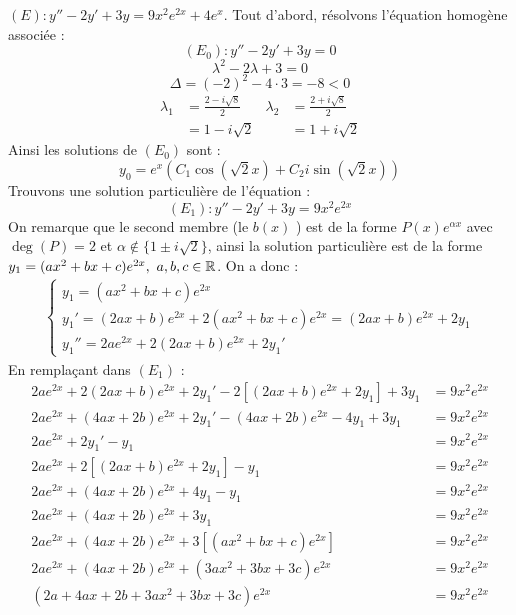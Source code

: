 \begin{example}
    $(E) : y'' - 2y' + 3y = 9x^2 e^{2x} + 4e^x$.
    Tout d'abord, résolvons l'équation homogène associée :
    \[ (E_0) : y'' - 2y' + 3y = 0 \]
    \[ \lambda^2 - 2\lambda + 3 = 0 \]
    \[ \Delta = (-2)^2 - 4 \cdot 3 = -8 < 0 \]
    \begin{align*}
        \lambda_1 &= \frac{2 - i\sqrt{8}}{2} & \lambda_2 &= \frac{2 + i\sqrt{8}}{2} \\
        &= 1 - i\sqrt{2} & &= 1 + i\sqrt{2}
    \end{align*}
    Ainsi les solutions de $(E_0)$ sont :
    \[ y_0 = e^x \left(C_1 \cos(\sqrt{2}x) + C_2 i \sin(\sqrt{2}x) \right) \]
    Trouvons une solution particulière de l'équation :
    \[ (E_1) : y'' - 2y' + 3y = 9x^2 e^{2x} \]
    On remarque que le second membre (le \og $b(x)$ \fg) est de la forme $P(x) e^{\alpha x}$ avec $\deg(P) = 2$ et $\alpha \notin \{1 \pm i\sqrt{2}\}$, ainsi la solution particulière est de la forme $y_1 = (ax^2 + bx + c)e^{2x},\ a, b, c \in \mathbb{R}$.
    On a donc :
    \begin{align*}
        \begin{cases}
            y_1 = (ax^2 + bx + c)e^{2x} \\
            y_1' = (2ax + b)e^{2x} + 2(ax^2 + bx + c)e^{2x} = (2ax + b)e^{2x} + 2y_1 \\
            y_1'' = 2a e^{2x} + 2(2ax + b)e^{2x} + 2y_1'
        \end{cases}
    \end{align*}
    En remplaçant dans $(E_1)$ :
    \begin{align*}
        2ae^{2x} + 2(2ax + b)e^{2x} + 2y_1' - 2[(2ax + b)e^{2x} + 2y_1] + 3y_1 &= 9x^2 e^{2x} \\
        2ae^{2x} + (4ax + 2b)e^{2x} + 2y_1' - (4ax + 2b)e^{2x} - 4y_1 + 3y_1 &= 9x^2 e^{2x} \\
        2ae^{2x}+ 2y_1' - y_1 &= 9x^2e^{2x} \\
        2ae^{2x} + 2[(2ax + b)e^{2x} + 2y_1] - y_1 &= 9x^2e^{2x} \\
        2ae^{2x} + (4ax + 2b)e^{2x} + 4 y_1 - y_1 &= 9x^2 e^{2x} \\
        2ae^{2x} + (4ax + 2b)e^{2x} + 3y_1 &= 9x^2e^{2x} \\
        2ae^{2x} + (4ax + 2b)e^{2x} + 3[(ax^2 + bx + c)e^{2x}] &= 9x^2 e^{2x} \\ 
        2ae^{2x} + (4ax + 2b)e^{2x} + (3ax^2 + 3bx + 3c)e^{2x} &= 9x^2 e^{2x} \\
        (2a + 4ax + 2b + 3ax^2 + 3bx + 3c)e^{2x} &= 9x^2 e^{2x} \\

\end{align*}
\end{example}
